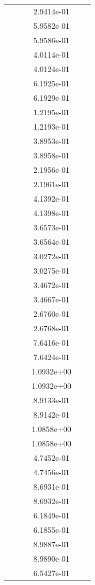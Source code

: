 \begin{xltabular}{\textwidth}{r|rS[table-format=1.3e+2]S[table-format=1.4e+2]S[table-format=1.4e+2]S[table-format=-1.5]}
&  &  & 2.9414e-01 & & \\
&  &  & 5.9582e-01 & & \\
&  &  & 5.9586e-01 & & \\
&  &  & 4.0114e-01 & & \\
&  &  & 4.0124e-01 & & \\
&  &  & 6.1925e-01 & & \\
&  &  & 6.1929e-01 & & \\
&  &  & 1.2195e-01 & & \\
&  &  & 1.2193e-01 & & \\
&  &  & 3.8953e-01 & & \\
&  &  & 3.8958e-01 & & \\
&  &  & 2.1956e-01 & & \\
&  &  & 2.1961e-01 & & \\
&  &  & 4.1392e-01 & & \\
&  &  & 4.1398e-01 & & \\
&  &  & 3.6573e-01 & & \\
&  &  & 3.6564e-01 & & \\
&  &  & 3.0272e-01 & & \\
&  &  & 3.0275e-01 & & \\
&  &  & 3.4672e-01 & & \\
&  &  & 3.4667e-01 & & \\
&  &  & 2.6760e-01 & & \\
&  &  & 2.6768e-01 & & \\
&  &  & 7.6416e-01 & & \\
&  &  & 7.6424e-01 & & \\
&  &  & 1.0932e+00 & & \\
&  &  & 1.0932e+00 & & \\
&  &  & 8.9133e-01 & & \\
&  &  & 8.9142e-01 & & \\
&  &  & 1.0858e+00 & & \\
&  &  & 1.0858e+00 & & \\
&  &  & 4.7452e-01 & & \\
&  &  & 4.7456e-01 & & \\
&  &  & 8.6931e-01 & & \\
&  &  & 8.6932e-01 & & \\
&  &  & 6.1849e-01 & & \\
&  &  & 6.1855e-01 & & \\
&  &  & 8.9887e-01 & & \\
&  &  & 8.9890e-01 & & \\
&  &  & 6.5427e-01 & & \\

\end{xltabular}
